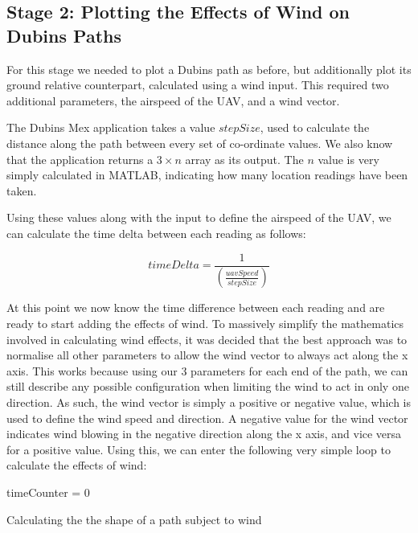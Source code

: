 \subsection{Stage 2: Plotting the Effects of Wind on Dubins Paths}
\label{task1:implementation:stage2}

For this stage we needed to plot a Dubins path as before, but additionally plot its ground relative counterpart, calculated using a wind input. This required two additional parameters, the airspeed of the UAV, and a wind vector. 

The Dubins Mex application takes a value $stepSize$, used to calculate the distance along the path between every set of co-ordinate values. We also know that the application returns a $3 \times n$ array as its output. The $n$ value is very simply calculated in MATLAB, indicating how many location readings have been taken.

Using these values along with the input to define the airspeed of the UAV, we can calculate the time delta between each reading as follows:

\begin{equation}
	timeDelta = \frac{1}{(\frac{uavSpeed}{stepSize})}
\end{equation}

At this point we now know the time difference between each reading and are ready to start adding the effects of wind. To massively simplify the mathematics involved in calculating wind effects, it was decided that the best approach was to normalise all other parameters to allow the wind vector to always act along the x axis. This works because using our 3 parameters for each end of the path, we can still describe any possible configuration when limiting the wind to act in only one direction. As such, the wind vector is simply a positive or negative value, which is used to define the wind speed and direction. A negative value for the wind vector indicates wind blowing in the negative direction along the x axis, and vice versa for a positive value. Using this, we can enter the following very simple loop to calculate the effects of wind:

\begin{center}
\begin{minipage}{\linewidth}
\begin{algorithm}[H]
\label{pp2Algorithm}
\SetAlgoLined
	timeCounter = 0\;
\caption{Calculating the the shape of a path subject to wind}
\end{algorithm}
\end{minipage}
\end{center}

